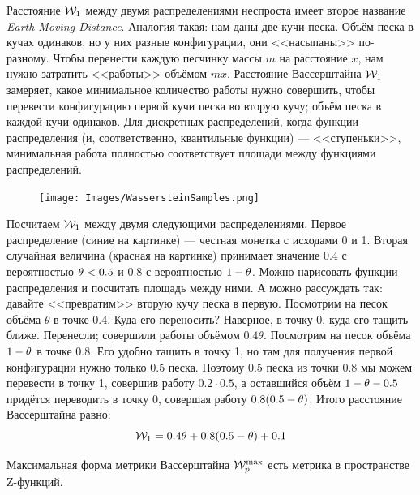 \begin{exampleBox}[label=ex:emd]{}
Расстояние $\mathcal{W}_1$ между двумя распределениями неспроста имеет второе название \emph{Earth Moving Distance}. Аналогия такая: нам даны две кучи песка. Объём песка в кучах одинаков, но у них разные конфигурации, они <<насыпаны>> по-разному. Чтобы перенести каждую песчинку массы $m$ на расстояние $x$, нам нужно затратить <<работы>> объёмом $mx$. Расстояние Вассерштайна $\mathcal{W}_1$ замеряет, какое минимальное количество работы нужно совершить, чтобы перевести конфигурацию первой кучи песка во вторую кучу; объём песка в каждой кучи одинаков. Для дискретных распределений, когда функции распределения (и, соответственно, квантильные функции) --- <<ступеньки>>, минимальная работа полностью соответствует площади между функциями распределений.

\begin{figure}
\vspace{-0.3cm}
\centering
\texttt{[image: Images/WassersteinSamples.png]}
\vspace{-0.6cm}
\end{figure}
Посчитаем $\mathcal{W}_1$ между двумя следующими распределениями. Первое распределение (синие на картинке) --- честная монетка с исходами 0 и 1. Вторая случайная величина (красная на картинке) принимает значение 0.4 с вероятностью $\theta \HM< 0.5$ и 0.8 с вероятностью $1 \HM- \theta$. Можно нарисовать функции распределения и посчитать площадь между ними. А можно рассуждать так: давайте <<превратим>> вторую кучу песка в первую. Посмотрим на песок объёма $\theta$ в точке 0.4. Куда его переносить? Наверное, в точку 0, куда его тащить ближе. Перенесли; совершили работы объёмом $0.4\theta$. Посмотрим на песок объёма $1 \HM- \theta$ в точке 0.8. Его удобно тащить в точку 1, но там для получения первой конфигурации нужно только 0.5 песка. Поэтому 0.5 песка из точки 0.8 мы можем перевести в точку 1, совершив работу $0.2 \cdot 0.5$, а оставшийся объём $1 \HM- \theta \HM- 0.5$ придётся переводить в точку 0, совершая работу $0.8 (0.5 \HM- \theta)$. Итого расстояние Вассерштайна равно:
$$\mathcal{W}_1 = 0.4\theta + 0.8(0.5 - \theta) + 0.1$$
\end{exampleBox}

\begin{proposition}
Максимальная форма метрики Вассерштайна $\mathcal{W}^{\max}_p$ есть метрика в пространстве Z-функций.
\end{proposition}

